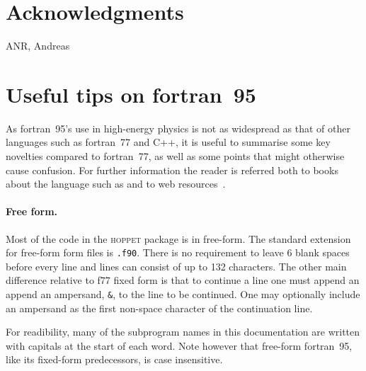 \documentclass[12pt]{article}
\newcommand{\hoppet}{\textsc{hoppet}\xspace}
\newcommand{\ttt}[1]{\texttt{#1}}
\begin{document}
\section*{Acknowledgments}

ANR, Andreas

\appendix

\section{Useful tips on fortran~95}
\label{sec:f95appendix}

As fortran~95's use in high-energy physics is not as widespread as
that of other languages such as fortran~77 and C++, it is useful to
summarise some key novelties compared to fortran~77, as well as some
points that might otherwise cause confusion. For further information
the reader is referred both to books about the language such as
\cite{F95Explained} and to web resources~\cite{F95WebResources}.

\paragraph{Free form.}  Most of the code in the \hoppet package is in
free-form. The standard extension for free-form form files is
\ttt{.f90}. There is no requirement to leave 6 blank spaces before
every line and lines can consist of up to 132 characters. The other
main difference relative to f77 fixed form is that to continue a line
one must append an append an ampersand, \ttt{\&}, to the line to be
continued. One may optionally include an ampersand as the first
non-space character of the continuation line.

For readibility, many of the subprogram names in this documentation
are written with capitals at the start of each word. Note however that
free-form fortran~95, like its fixed-form predecessors, is case
insensitive.
\end{document}
